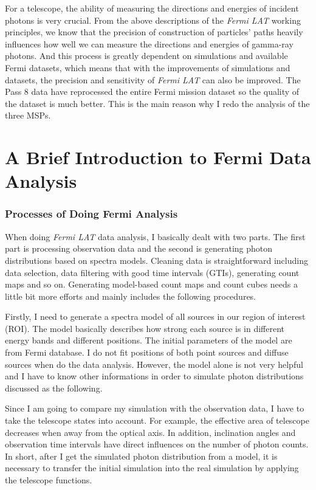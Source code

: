 \documentclass[12pt]{report}
\begin{document}
    For a telescope, the ability of measuring the directions and energies of incident 
    photons is very crucial. From the above descriptions of the \textit{Fermi LAT} 
    working principles, we know that the precision of construction of particles' paths 
    heavily influences how well we can measure the directions and energies of gamma-ray 
    photons. And this process is greatly dependent on simulations and available Fermi datasets,
    which means that with the improvements of simulations and datasets,
    the precision and sensitivity of \textit{Fermi LAT} can also be improved. The Pass 8 data 
    have reprocessed the entire Fermi mission dataset so the quality of the dataset is much 
    better. This is the main reason why I redo the analysis of the three MSPs.

  \section{A Brief Introduction to Fermi Data Analysis}
    \subsubsection{Processes of Doing Fermi Analysis}
      When doing \textit{Fermi LAT} data analysis, I basically dealt with two parts. The 
      first part is processing observation data and the second is generating photon 
      distributions based on spectra models. Cleaning data is straightforward including data 
      selection, data filtering with good time intervals (GTIs), generating count maps 
      and so on. Generating model-based count maps and count cubes needs a little bit 
      more efforts and mainly includes the following procedures. 

      Firstly, I need to generate a spectra model of all sources in our region of 
      interest (ROI). The model basically describes how strong each source is in 
      different energy bands and different positions. The initial parameters of the 
      model are from Fermi database. I do not fit positions of both point sources and 
      diffuse sources when do the data analysis. 
      However, the model alone is not very 
      helpful and I have to know other informations in order to simulate photon 
      distributions discussed as the following.

      Since I am going to compare my simulation with the observation data, I have to take 
      the telescope states into account. For example, the effective area of telescope 
      decreases when away from the optical axis. In addition, inclination angles and 
      observation time intervals have direct influences on the number of photon counts. 
      In short, after I get the simulated photon distribution from a model, it is 
      necessary to transfer the initial simulation into the real simulation by applying 
      the telescope functions. 
          
\end{document}
